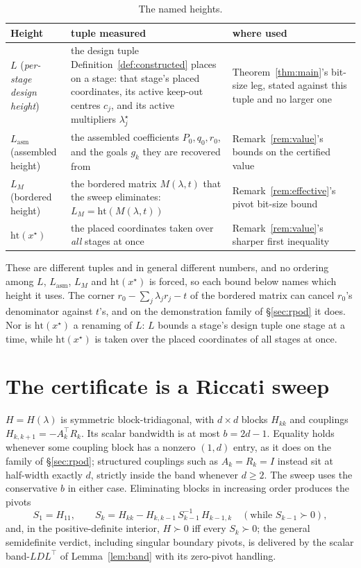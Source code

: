 \documentclass[11pt]{article}
\theoremstyle{definition}
\theoremstyle{remark}
\renewcommand{\_}{\ifdim\fontdimen3\font=0pt\relax\char`\_\else\textunderscore\fi\hspace{0pt}}
\begin{document}
\begin{table}[ht]\centering
\caption{The named heights.}
\label{tab:heights}
\begin{tabular*}{6.1in}{@{}p{1.35in}p{2.35in}p{2.0in}@{}}
\toprule
Height & tuple measured & where used\\
\midrule
$L$ (\emph{per-stage design height}) & the design tuple
Definition~\ref{def:constructed} places on a stage: that stage's placed
coordinates, its active keep-out centres $c_j$, and its active multipliers
$\lambda^\star_j$ & Theorem~\ref{thm:main}'s bit-size leg, stated against this
tuple and no larger one\\
\addlinespace
$L_{\mathrm{asm}}$ (assembled height) & the assembled coefficients
$P_0,q_0,r_0$, and the goals $g_k$ they are recovered from &
Remark~\ref{rem:value}'s bounds on the certified value\\
\addlinespace
$L_M$ (bordered height) & the bordered matrix $M(\lambda,t)$ that the sweep
eliminates: $L_M=\mathrm{ht}(M(\lambda,t))$ & Remark~\ref{rem:effective}'s
pivot bit-size bound\\
\addlinespace
$\mathrm{ht}(x^\star)$ & the placed coordinates taken over \emph{all} stages
at once & Remark~\ref{rem:value}'s sharper first inequality\\
\bottomrule
\end{tabular*}
\end{table}

\noindent These are different tuples and in general different numbers, and no
ordering among $L$, $L_{\mathrm{asm}}$, $L_M$ and $\mathrm{ht}(x^\star)$ is
forced, so each bound below names which height it uses. The corner
$r_0-\sum_j\lambda_jr_j-t$ of the bordered matrix can cancel $r_0$'s
denominator against $t$'s, and on the demonstration family of \S\ref{sec:rpod}
it does. Nor is $\mathrm{ht}(x^\star)$ a renaming of $L$: $L$ bounds a stage's
design tuple one stage at a time, while $\mathrm{ht}(x^\star)$ is taken over
the placed coordinates of all stages at once.

\section{The certificate is a Riccati sweep}\label{sec:riccati}
$H=H(\lambda)$ is symmetric block-tridiagonal, with $d\times d$ blocks
$H_{kk}$ and couplings $H_{k,k+1}=-A_k^\top R_k$. Its scalar bandwidth is at
most $b=2d-1$. Equality holds whenever some coupling block has a nonzero
$(1,d)$ entry, as it does on the family of \S\ref{sec:rpod}; structured
couplings such as $A_k=R_k=I$ instead sit at half-width exactly $d$, strictly
inside the band whenever $d\ge2$. The sweep uses the conservative $b$ in
either case. Eliminating blocks in increasing order
produces the pivots
\begin{equation}\label{eq:riccati}
S_1=H_{11},\qquad S_k=H_{kk}-H_{k,k-1}\,S_{k-1}^{-1}\,H_{k-1,k}
\quad(\text{while } S_{k-1}\succ0),
\end{equation}
and, in the positive-definite interior, $H\succ0$ iff every $S_k\succ0$; the
general semidefinite verdict, including singular boundary pivots, is delivered
by the scalar band-$LDL^\top$ of Lemma~\ref{lem:band} with its zero-pivot
handling.
\end{document}
